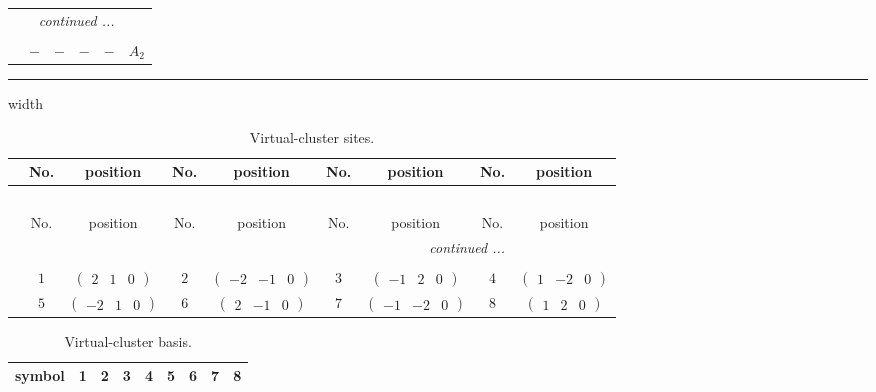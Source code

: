 \documentclass[fleqn,10pt,landscape]{article}
\begin{document}
\begin{itemize}
\begin{center}
\begin{longtable}{cccccc}
 \hline \hline
\multicolumn{5}{r}{\footnotesize\it continued ...} \\ \endfoot

 \hline \hline
\multicolumn{5}{r}{} \\ \endlastfoot

$  $ & $ - $ & $ - $ & $ - $ & $ - $ & $ A_{2} $ \\
\end{longtable}
\end{center}

 \hfil \hrule height 1mm width \textwidth \hfil

{
\scriptsize
\begin{center}
\renewcommand{\arraystretch}{1.7}
\begin{longtable}{ccccccccc}
\caption{Virtual-cluster sites.}
 \\
 \hline \hline
 & No. & position & No. & position & No. & position & No. & position \\ \hline \endfirsthead

\multicolumn{8}{l}{\tablename\ \thetable{}} \\
 \hline \hline
 & No. & position & No. & position & No. & position & No. & position \\ \hline \endhead

 \hline \hline
\multicolumn{8}{r}{\footnotesize\it continued ...} \\ \endfoot

 \hline \hline
\multicolumn{8}{r}{} \\ \endlastfoot

 & $ 1 $ & $ \begin{pmatrix} 2 & 1 & 0 \end{pmatrix} $ & $ 2 $ & $ \begin{pmatrix} -2 & -1 & 0 \end{pmatrix} $ & $ 3 $ & $ \begin{pmatrix} -1 & 2 & 0 \end{pmatrix} $ & $ 4 $ & $ \begin{pmatrix} 1 & -2 & 0 \end{pmatrix} $ \\
& $ 5 $ & $ \begin{pmatrix} -2 & 1 & 0 \end{pmatrix} $ & $ 6 $ & $ \begin{pmatrix} 2 & -1 & 0 \end{pmatrix} $ & $ 7 $ & $ \begin{pmatrix} -1 & -2 & 0 \end{pmatrix} $ & $ 8 $ & $ \begin{pmatrix} 1 & 2 & 0 \end{pmatrix} $ \\
\end{longtable}
\end{center}
\begin{center}
\renewcommand{\arraystretch}{1.7}
\begin{longtable}{ccccccccc}
\caption{Virtual-cluster basis.}
 \\
 \hline \hline
symbol & 1 & 2 & 3 & 4 & 5 & 6 & 7 & 8 \\ \hline \endfirsthead


\end{longtable}
\end{center}}
\end{itemize}
\end{document}
